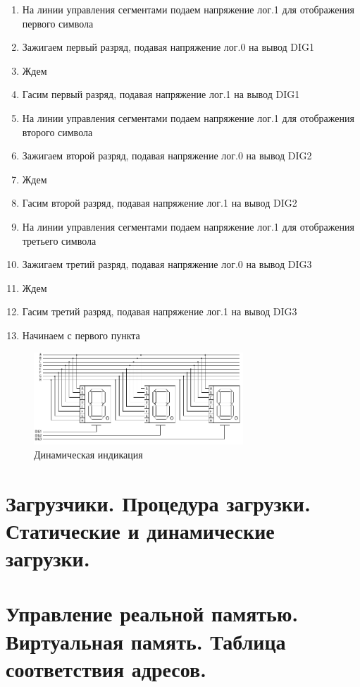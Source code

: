 \documentclass[unicode, 12pt, a4paper, oneside]{article}
\begin{document}
\begin{enumerate}
\item На линии управления сегментами подаем напряжение лог.1 для отображения первого символа
\item Зажигаем первый разряд, подавая напряжение лог.0 на вывод DIG1
\item Ждем
\item Гасим первый разряд, подавая напряжение лог.1 на вывод DIG1
\item На линии управления сегментами подаем напряжение лог.1 для отображения второго символа
\item Зажигаем второй разряд, подавая напряжение лог.0 на вывод DIG2
\item Ждем
\item Гасим второй разряд, подавая напряжение лог.1 на вывод DIG2
\item На линии управления сегментами подаем напряжение лог.1 для отображения третьего символа
\item Зажигаем третий разряд, подавая напряжение лог.0 на вывод DIG3
\item Ждем
\item Гасим третий разряд, подавая напряжение лог.1 на вывод DIG3
\item Начинаем с первого пункта  
\end{enumerate}

\begin{figure}[H]
\centering
\includegraphics[width=0.7\textwidth]{158_Indi.png}
\caption{Динамическая индикация}
\end{figure}

\section{Загрузчики. Процедура загрузки. Статические и динамические загрузки.}

\section{Управление реальной памятью. Виртуальная память. Таблица соответствия адресов.}
\end{document}

